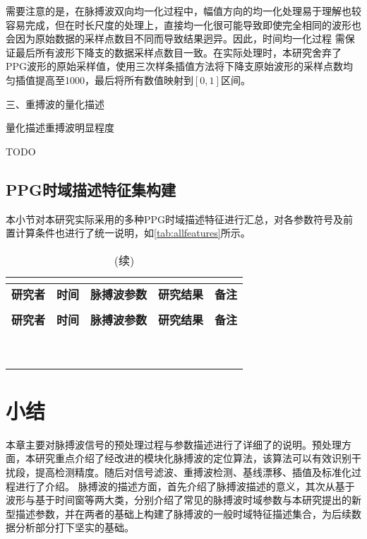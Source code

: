 需要注意的是，在脉搏波双向均一化过程中，幅值方向的均一化处理易于理解也较容易完成，但在时长尺度的处理上，直接均一化很可能导致即使完全相同的波形也会因为原始数据的采样点数目不同而导致结果迥异。因此，时间均一化过程
需保证最后所有波形下降支的数据采样点数目一致。在实际处理时，本研究舍弃了PPG波形的原始采样值，使用三次样条插值方法将下降支原始波形的采样点数均匀插值提高至1000，最后将所有数值映射到$[0,1]$区间。

三、重搏波的量化描述

量化描述重搏波明显程度

TODO

\subsection{PPG时域描述特征集构建}
本小节对本研究实际采用的多种PPG时域描述特征进行汇总，对各参数符号及前置计算条件也进行了统一说明，如\autoref{tab:allfeatures}所示。
\begin{center}
    \fontsize{10}{4}
	\begin{longtable}{p{3cm}<{\centering}p{1cm}<{\centering}p{2cm}<{\centering}p{6cm}<{\centering}p{1cm}<{\centering}}
		\caption{本研究使用的所有PPG时域指标一览}\\
		\label{tab:allfeatures}\\
		\hline
            \textbf{研究者}&\textbf{时间}&\textbf{脉搏波参数}&\textbf{研究结果}&\textbf{备注}\\
        \hline
        \endfirsthead
        \caption[]{(续)}\\
        \hline
            \textbf{研究者}&\textbf{时间}&\textbf{脉搏波参数}&\textbf{研究结果}&\textbf{备注}\\
        \hline
        \endhead 
        \hline
        \endfoot
        &       &       &       &  \\
        &       &       &       &  \\
        &       &       &       &  \\
        &       &       &       &  \\
        &       &       &       &  \\
        &       &       &       &  \\
        &       &       &       &  \\
        &       &       &       &  \\
        &       &       &       &  \\
	\end{longtable}
\end{center}
\section{小结}
本章主要对脉搏波信号的预处理过程与参数描述进行了详细了的说明。预处理方面，本研究重点介绍了经改进的模块化脉搏波的定位算法，该算法可以有效识别干扰段，提高检测精度。随后对信号滤波、重搏波检测、基线漂移、插值及标准化过程进行了介绍。
脉搏波的描述方面，首先介绍了脉搏波描述的意义，其次从基于波形与基于时间窗等两大类，分别介绍了常见的脉搏波时域参数与本研究提出的新型描述参数，并在两者的基础上构建了脉搏波的一般时域特征描述集合，为后续数据分析部分打下坚实的基础。